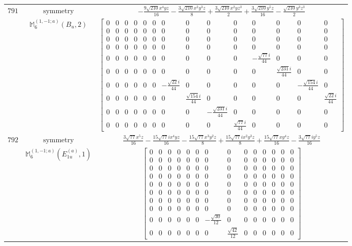 \documentclass[fleqn,8pt,landscape]{jsarticle}
\begin{document}
\begin{longtable}{ccc}
$ 791 $ & $ \text{symmetry} $ & $ - \frac{9 \sqrt{210} x^{4} y z}{16} - \frac{3 \sqrt{210} x^{2} y^{3} z}{8} + \frac{3 \sqrt{210} x^{2} y z^{3}}{2} + \frac{3 \sqrt{210} y^{5} z}{16} - \frac{\sqrt{210} y^{3} z^{3}}{2} $ \\
$  $ & $ \mathbb{M}_{6}^{(1,-1;a)}(B_{u},2) $ & $ \begin{bmatrix} 0 & 0 & 0 & 0 & 0 & 0 & 0 & 0 & 0 & 0 & 0 & 0 & 0 & 0 \\ 0 & 0 & 0 & 0 & 0 & 0 & 0 & 0 & 0 & 0 & 0 & 0 & 0 & 0 \\ 0 & 0 & 0 & 0 & 0 & 0 & 0 & 0 & 0 & 0 & 0 & 0 & 0 & 0 \\ 0 & 0 & 0 & 0 & 0 & 0 & 0 & 0 & 0 & 0 & 0 & 0 & 0 & 0 \\ 0 & 0 & 0 & 0 & 0 & 0 & 0 & 0 & 0 & 0 & - \frac{\sqrt{77} i}{44} & 0 & 0 & 0 \\ 0 & 0 & 0 & 0 & 0 & 0 & 0 & 0 & 0 & 0 & 0 & \frac{\sqrt{231} i}{44} & 0 & 0 \\ 0 & 0 & 0 & 0 & 0 & 0 & - \frac{\sqrt{22} i}{44} & 0 & 0 & 0 & 0 & 0 & - \frac{\sqrt{154} i}{44} & 0 \\ 0 & 0 & 0 & 0 & 0 & 0 & 0 & \frac{\sqrt{154} i}{44} & 0 & 0 & 0 & 0 & 0 & \frac{\sqrt{22} i}{44} \\ 0 & 0 & 0 & 0 & 0 & 0 & 0 & 0 & - \frac{\sqrt{231} i}{44} & 0 & 0 & 0 & 0 & 0 \\ 0 & 0 & 0 & 0 & 0 & 0 & 0 & 0 & 0 & \frac{\sqrt{77} i}{44} & 0 & 0 & 0 & 0 \end{bmatrix} $ \\ \hline
$ 792 $ & $ \text{symmetry} $ & $ \frac{3 \sqrt{77} x^{5} z}{16} - \frac{15 \sqrt{77} i x^{4} y z}{16} - \frac{15 \sqrt{77} x^{3} y^{2} z}{8} + \frac{15 \sqrt{77} i x^{2} y^{3} z}{8} + \frac{15 \sqrt{77} x y^{4} z}{16} - \frac{3 \sqrt{77} i y^{5} z}{16} $ \\
$  $ & $ \mathbb{M}_{6}^{(1,-1;a)}(E_{1u}^{(a)},1) $ & $ \begin{bmatrix} 0 & 0 & 0 & 0 & 0 & 0 & 0 & 0 & 0 & 0 & 0 & 0 & 0 & 0 \\ 0 & 0 & 0 & 0 & 0 & 0 & 0 & 0 & 0 & 0 & 0 & 0 & 0 & 0 \\ 0 & 0 & 0 & 0 & 0 & 0 & 0 & 0 & 0 & 0 & 0 & 0 & 0 & 0 \\ 0 & 0 & 0 & 0 & 0 & 0 & 0 & 0 & 0 & 0 & 0 & 0 & 0 & 0 \\ 0 & 0 & 0 & 0 & 0 & 0 & 0 & 0 & 0 & 0 & 0 & 0 & 0 & 0 \\ 0 & 0 & 0 & 0 & 0 & 0 & 0 & 0 & 0 & 0 & 0 & 0 & 0 & 0 \\ 0 & 0 & 0 & 0 & 0 & 0 & 0 & 0 & 0 & 0 & 0 & 0 & 0 & 0 \\ 0 & 0 & 0 & 0 & 0 & 0 & 0 & 0 & 0 & 0 & 0 & 0 & 0 & 0 \\ 0 & 0 & 0 & 0 & 0 & 0 & - \frac{\sqrt{30}}{12} & 0 & 0 & 0 & 0 & 0 & 0 & 0 \\ 0 & 0 & 0 & 0 & 0 & 0 & 0 & \frac{\sqrt{42}}{12} & 0 & 0 & 0 & 0 & 0 & 0 \end{bmatrix} $ \\ \hline

\end{longtable}
\end{document}
